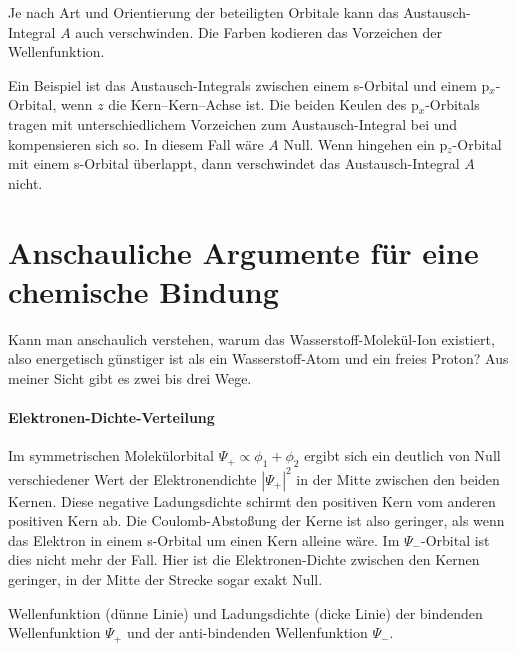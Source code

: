\begin{marginfigure}

\caption{Je nach Art und Orientierung der beteiligten Orbitale kann das Austausch-Integral $A$ auch verschwinden. Die Farben kodieren das Vorzeichen der Wellenfunktion. }
\end{marginfigure}



Ein Beispiel ist das Austausch-Integrals zwischen  einem s-Orbital und einem p$_x$-Orbital, wenn $z$ die Kern--Kern--Achse ist.  Die beiden Keulen des  p$_x$-Orbitals tragen mit unterschiedlichem Vorzeichen zum Austausch-Integral bei und kompensieren sich so. In diesem Fall wäre $A$ Null. Wenn hingehen ein p$_z$-Orbital mit einem s-Orbital überlappt, dann verschwindet das  Austausch-Integral $A$ nicht.


\section{Anschauliche Argumente für eine chemische Bindung}

Kann man anschaulich verstehen, warum das Wasserstoff-Molekül-Ion existiert, also energetisch günstiger ist als ein Wasserstoff-Atom und ein freies Proton? Aus meiner Sicht gibt es zwei bis drei Wege.

\paragraph{Elektronen-Dichte-Verteilung} Im symmetrischen Molekülorbital $\Psi_+ \propto \phi_1 + \phi_2$ ergibt sich ein deutlich von Null verschiedener Wert der Elektronendichte $|\Psi_+|^2$ in der Mitte zwischen den beiden Kernen. Diese negative Ladungsdichte schirmt den positiven Kern vom anderen positiven Kern ab. Die Coulomb-Abstoßung der Kerne ist also geringer, als wenn das Elektron in einem s-Orbital um einen Kern alleine  wäre. Im $\Psi_-$-Orbital ist dies nicht mehr der Fall. Hier ist die Elektronen-Dichte zwischen den Kernen geringer, in der Mitte der Strecke sogar exakt Null.

\begin{marginfigure}


\caption{ Wellenfunktion (dünne Linie) und Ladungsdichte (dicke Linie) der bindenden Wellenfunktion $\Psi_+$ und der  anti-bindenden Wellenfunktion $\Psi_-$.}
\end{marginfigure}



